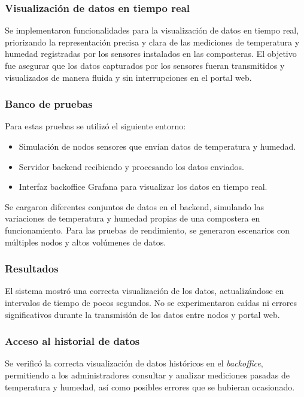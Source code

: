 \subsubsection{Visualización de datos en tiempo real}

Se implementaron funcionalidades para la visualización de datos en tiempo real, priorizando la representación precisa y clara de las mediciones de temperatura y humedad registradas por los sensores instalados en las composteras. El objetivo fue asegurar que los datos capturados por los sensores fueran transmitidos y visualizados de manera fluida y sin interrupciones en el portal web.

\subsubsection{Banco de pruebas}
Para estas pruebas se utilizó el siguiente entorno:
\begin{itemize}
    \item Simulación de nodos sensores que envían datos de temperatura y humedad.
    \item Servidor backend recibiendo y procesando los datos enviados.
    \item Interfaz backoffice Grafana para visualizar los datos en tiempo real.
\end{itemize}

Se cargaron diferentes conjuntos de datos en el backend, simulando las variaciones de temperatura y humedad propias de una compostera en funcionamiento. Para las pruebas de rendimiento, se generaron escenarios con múltiples nodos y altos volúmenes de datos. 

\subsubsection{Resultados}
El sistema mostró una correcta visualización de los datos, actualizándose en intervalos de tiempo de pocos segundos. No se experimentaron caídas ni errores significativos durante la transmisión de los datos entre nodos y portal web.

\subsubsection{Acceso al historial de datos}

Se verificó la correcta visualización de datos históricos en el \textit{backoffice}, permitiendo a los administradores consultar y analizar mediciones pasadas de temperatura y humedad, así como posibles errores que se hubieran ocasionado. 

